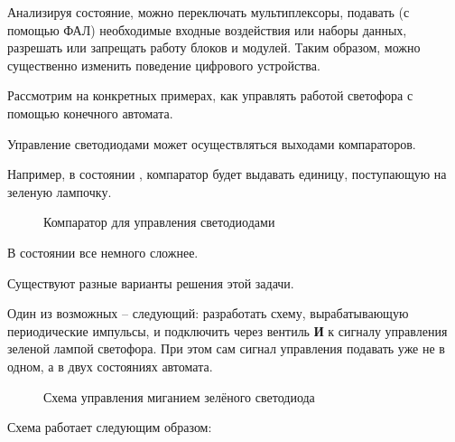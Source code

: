 \par{Анализируя состояние, можно переключать мультиплексоры, подавать (с помощью ФАЛ) необходимые входные воздействия или наборы данных, разрешать или запрещать работу блоков и модулей. Таким образом, можно существенно изменить поведение цифрового устройства.}

\par{Рассмотрим на конкретных примерах, как управлять работой светофора с помощью конечного автомата.}

\par{Управление светодиодами может осуществляться выходами компараторов.}

\par{Например, в состоянии , компаратор будет выдавать единицу, поступающую на зеленую лампочку.}

\begin{figure}[H]
  \centering
  \def\svgwidth{10cm}
  
  \caption{Компаратор для управления светодиодами}
\end{figure}

\par{В состоянии  все немного сложнее.}

\par{Существуют разные варианты решения этой задачи.}

\par{Один из возможных – следующий: разработать схему, вырабатывающую периодические импульсы, и подключить через вентиль \textbf{И} к сигналу управления зеленой лампой светофора. При этом сам сигнал управления подавать уже не в одном, а в двух состояниях автомата.}

\begin{figure}[H]
  \centering
  \def\svgwidth{\columnwidth}
  
  \caption{Схема управления миганием зелёного светодиода}
\end{figure}

\par{Схема работает следующим образом:}

